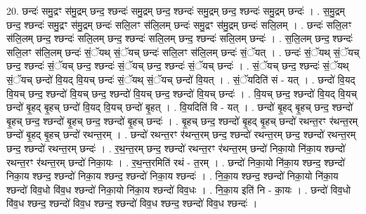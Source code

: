 \documentclass[17pt]{extarticle}
\begin{document}
20. छन्दः॑ समु॒द्रꣳ स॑मु॒द्रम् छन्द॒ श्छन्दः॑ समु॒द्रम् छन्द॒ श्छन्दः॑ समु॒द्रम् छन्द॒ श्छन्दः॑ समु॒द्रम् छन्दः॑ । . स॒मु॒द्रम् छन्द॒ श्छन्दः॑ समु॒द्रꣳ स॑मु॒द्रम् छन्दः॑ सलि॒लꣳ स॑लि॒लम् छन्दः॑ समु॒द्रꣳ स॑मु॒द्रम् छन्दः॑ सलि॒लम् । . छन्दः॑ सलि॒लꣳ स॑लि॒लम् छन्द॒ श्छन्दः॑ सलि॒लम् छन्द॒ श्छन्दः॑ सलि॒लम् छन्द॒ श्छन्दः॑ सलि॒लम् छन्दः॑ । . स॒लि॒लम् छन्द॒ श्छन्दः॑ सलि॒लꣳ स॑लि॒लम् छन्दः॑ सं॒ॅयथ् सं॒ॅयच् छन्दः॑ सलि॒लꣳ स॑लि॒लम् छन्दः॑ सं॒ॅयत् । . छन्दः॑ सं॒ॅयथ् सं॒ॅयच् छन्द॒ श्छन्दः॑ सं॒ॅयच् छन्द॒ श्छन्दः॑ सं॒ॅयच् छन्द॒ श्छन्दः॑ सं॒ॅयच् छन्दः॑ । . सं॒ॅयच् छन्द॒ श्छन्दः॑ सं॒ॅयथ् सं॒ॅयच् छन्दो॑ वि॒यद् वि॒यच् छन्दः॑ सं॒ॅयथ् सं॒ॅयच् छन्दो॑ वि॒यत् । . सं॒ॅयदिति॑ सं - यत् । . छन्दो॑ वि॒यद् वि॒यच् छन्द॒ श्छन्दो॑ वि॒यच् छन्द॒ श्छन्दो॑ वि॒यच् छन्द॒ श्छन्दो॑ वि॒यच् छन्दः॑ । . वि॒यच् छन्द॒ श्छन्दो॑ वि॒यद् वि॒यच् छन्दो॑ बृ॒हद् बृ॒हच् छन्दो॑ वि॒यद् वि॒यच् छन्दो॑ बृ॒हत् । . वि॒यदिति॑ वि - यत् । . छन्दो॑ बृ॒हद् बृ॒हच् छन्द॒ श्छन्दो॑ बृ॒हच् छन्द॒ श्छन्दो॑ बृ॒हच् छन्द॒ श्छन्दो॑ बृ॒हच् छन्दः॑ । . बृ॒हच् छन्द॒ श्छन्दो॑ बृ॒हद् बृ॒हच् छन्दो॑ रथन्त॒रꣳ र॑थन्त॒रम् छन्दो॑ बृ॒हद् बृ॒हच् छन्दो॑ रथन्त॒रम् । . छन्दो॑ रथन्त॒रꣳ र॑थन्त॒रम् छन्द॒ श्छन्दो॑ रथन्त॒रम् छन्द॒ श्छन्दो॑ रथन्त॒रम् छन्द॒ श्छन्दो॑ रथन्त॒रम् छन्दः॑ । . र॒थ॒न्त॒रम् छन्द॒ श्छन्दो॑ रथन्त॒रꣳ र॑थन्त॒रम् छन्दो॑ निका॒यो नि॑का॒य श्छन्दो॑ रथन्त॒रꣳ र॑थन्त॒रम् छन्दो॑ निका॒यः । . र॒थ॒न्त॒रमिति॑ रथं - त॒रम् । . छन्दो॑ निका॒यो नि॑का॒य श्छन्द॒ श्छन्दो॑ निका॒य श्छन्द॒ श्छन्दो॑ निका॒य श्छन्द॒ श्छन्दो॑ निका॒य श्छन्दः॑ । . नि॒का॒य श्छन्द॒ श्छन्दो॑ निका॒यो नि॑का॒य श्छन्दो॑ विव॒धो वि॑व॒ध श्छन्दो॑ निका॒यो नि॑का॒य श्छन्दो॑ विव॒धः । . नि॒का॒य इति॑ नि - का॒यः । . छन्दो॑ विव॒धो वि॑व॒ध श्छन्द॒ श्छन्दो॑ विव॒ध श्छन्द॒ श्छन्दो॑ विव॒ध श्छन्द॒ श्छन्दो॑ विव॒ध श्छन्दः॑ । \newline
\end{document}
